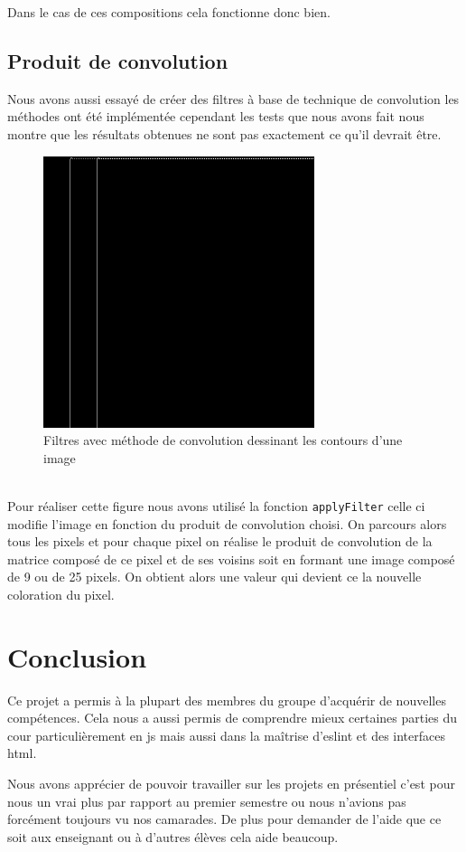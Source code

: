 \documentclass[a4paper,10pt]{article}
\begin{document}
Dans le cas de ces compositions cela fonctionne donc bien.
\subsection{Produit de convolution} 
Nous avons aussi essayé de créer des filtres à base de technique de convolution les méthodes ont été implémentée cependant les tests que nous avons fait nous montre que les résultats obtenues ne sont pas exactement ce qu'il devrait être. 
\begin{figure}[h]
\centering
  \includegraphics[scale=0.5]{convol1.png}
  \caption{Filtres avec méthode de convolution dessinant les contours d'une image}
\end{figure}
\\
Pour réaliser cette figure nous avons utilisé la fonction \texttt{applyFilter} celle ci modifie l'image en fonction du produit de convolution choisi. On parcours alors tous les pixels et pour chaque pixel on réalise le produit de convolution de la matrice composé de ce pixel et de ses voisins soit en formant une image composé de 9 ou de 25 pixels. On obtient alors une valeur qui devient ce la nouvelle coloration du pixel.

\section{Conclusion}
Ce projet a permis à la plupart des membres du groupe d'acquérir de nouvelles compétences. Cela nous a aussi permis de comprendre mieux certaines parties du cour particulièrement en js mais aussi dans la maîtrise d'eslint et des interfaces html.
\newline

Nous avons apprécier de pouvoir travailler sur les projets en présentiel c'est pour nous un vrai plus par rapport au premier semestre ou nous n'avions pas forcément toujours vu nos camarades. De plus pour demander de l'aide que ce soit aux enseignant ou à d'autres élèves cela aide beaucoup.
\newline
\end{document}
